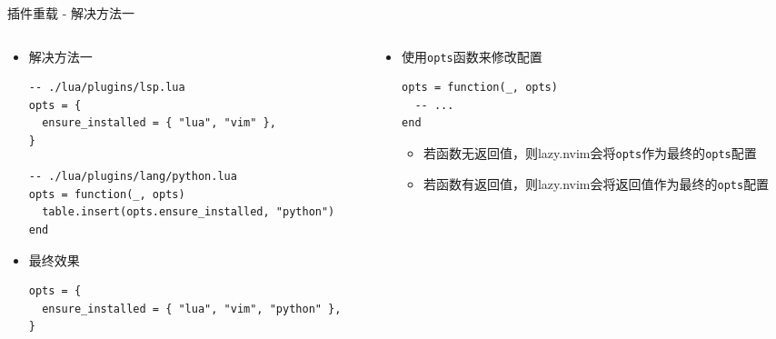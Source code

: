\documentclass[aspectratio=169]{ctexbeamer}
\begin{document}
\begin{frame}[fragile]{插件重载 - 解决方法一}
  \begin{columns}
    \begin{column}{0.5\linewidth}
      \begin{itemize}
        \item 解决方法一
          \begin{lstlisting}[basicstyle=\tiny\ttfamily]
-- ./lua/plugins/lsp.lua
opts = {
  ensure_installed = { "lua", "vim" },
}

-- ./lua/plugins/lang/python.lua
opts = function(_, opts)
  table.insert(opts.ensure_installed, "python")
end
          \end{lstlisting}
        \item 最终效果
          \begin{lstlisting}[basicstyle=\tiny\ttfamily]
opts = {
  ensure_installed = { "lua", "vim", "python" },
}
          \end{lstlisting}
      \end{itemize}
    \end{column}

    \begin{column}{0.5\linewidth}
      \begin{itemize}
        \item 使用\lstinline{opts}函数来修改配置
          \begin{lstlisting}[basicstyle=\tiny\ttfamily]
opts = function(_, opts)
  -- ...
end
          \end{lstlisting}
          \begin{itemize}
            \item 若函数无返回值，则lazy.nvim会将\lstinline{opts}作为最终的\lstinline{opts}配置
            \item 若函数有返回值，则lazy.nvim会将返回值作为最终的\lstinline{opts}配置
          \end{itemize}
      \end{itemize}
    \end{column}
  \end{columns}
\end{frame}
\end{document}
